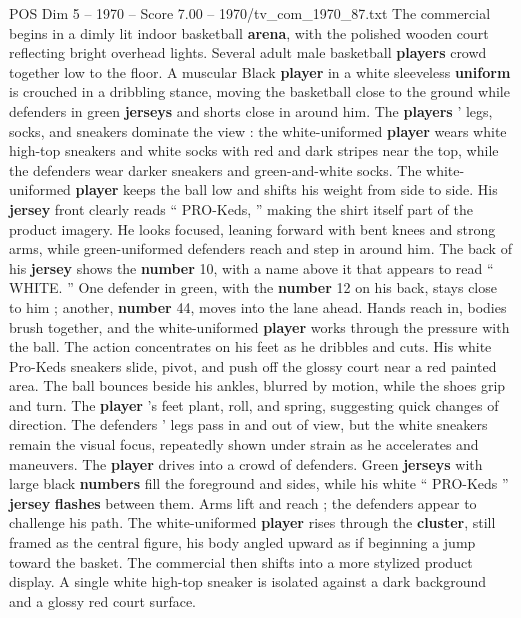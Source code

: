 \begin{textsample}{POS Dim 5 – 1970 – Score 7.00 – 1970/tv\_com\_1970\_87.txt}  \label{ex:f5_pos_082}
The commercial begins in a dimly lit indoor basketball \textbf{arena}, with the polished wooden court reflecting bright overhead lights.
Several adult male basketball \textbf{players} crowd together low to the floor.
A muscular Black \textbf{player} in a white sleeveless \textbf{uniform} is crouched in a dribbling stance, moving the basketball close to the ground while defenders in green \textbf{jerseys} and shorts close in around him.
The \textbf{players} ’ legs, socks, and sneakers dominate the view : the white-uniformed \textbf{player} wears white high-top sneakers and white socks with red and dark stripes near the top, while the defenders wear darker sneakers and green-and-white socks.
The white-uniformed \textbf{player} keeps the ball low and shifts his weight from side to side.
His \textbf{jersey} front clearly reads “ PRO-Keds, ” making the shirt itself part of the product imagery.
He looks focused, leaning forward with bent knees and strong arms, while green-uniformed defenders reach and step in around him.
The back of his \textbf{jersey} shows the \textbf{number} 10, with a name above it that appears to read “ WHITE. ” One defender in green, with the \textbf{number} 12 on his back, stays close to him ; another, \textbf{number} 44, moves into the lane ahead.
Hands reach in, bodies brush together, and the white-uniformed \textbf{player} works through the pressure with the ball.
The action concentrates on his feet as he dribbles and cuts.
His white Pro-Keds sneakers slide, pivot, and push off the glossy court near a red painted area.
The ball bounces beside his ankles, blurred by motion, while the shoes grip and turn.
The \textbf{player} ’s feet plant, roll, and spring, suggesting quick changes of direction.
The defenders ’ legs pass in and out of view, but the white sneakers remain the visual focus, repeatedly shown under strain as he accelerates and maneuvers.
The \textbf{player} drives into a crowd of defenders.
Green \textbf{jerseys} with large black \textbf{numbers} fill the foreground and sides, while his white “ PRO-Keds ” \textbf{jersey} \textbf{flashes} between them.
Arms lift and reach ; the defenders appear to challenge his path.
The white-uniformed \textbf{player} rises through the \textbf{cluster}, still framed as the central figure, his body angled upward as if beginning a jump toward the basket.
The commercial then shifts into a more stylized product display.
A single white high-top sneaker is isolated against a dark background and a glossy red court surface.

\end{textsample}
